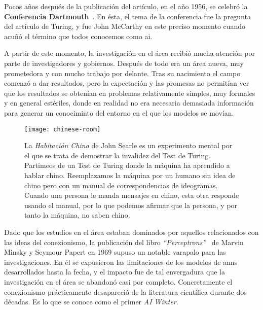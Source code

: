 Pocos años después de la publicación del artículo, en el año 1956, se celebró la \textbf{Conferencia Dartmouth}~\cite{mccarthy1956dartmouth}. En ésta, el tema de la conferencia fue la pregunta del artículo de Turing, y fue John McCarthy en este preciso momento cuando acuñó el término que todos conocemos como \ac{ai}.

A partir de este momento, la investigación en el área recibió mucha atención por parte de investigadores y gobiernos. Después de todo era un área nueva, muy prometedora y con mucho trabajo por delante. Tras su nacimiento el campo comenzó a dar resultados, pero la expectación y las promesas no permitían ver que los resultados se obtenían en problemas relativamente simples, muy formales y en general estériles, donde en realidad no era necesaria demasiada información para generar un conociminto del entorno en el que los modelos se movían.

\begin{figure}[t]
	\centering
	\texttt{[image: chinese-room]}
	\label{fig:chinese-room}
	\caption[Experimento mental de la \textit{Habitación China}, por John Searle]{La \textit{Habitación China} de John Searle es un experimento mental por el que se trata de demostrar la invalidez del Test de Turing. Partimeos de un Test de Turing donde la máquina ha aprendido a hablar chino. Reemplazamos la máquina por un humano sin idea de chino pero con un manual de correspondencias de ideogramas. Cuando una persona le manda mensajes en chino, esta otra responde usando el manual, por lo que podemos afirmar que la persona, y por tanto la máquina, no saben chino.}
\end{figure}

Dado que los estudios en el área estaban dominados por aquellos relacionados con las ideas del conexionismo, la publicación del libro \textit{\enquote{Perceptrons}}~\cite{minsky1969perceptrons} de Marvin Minsky y Seymour Papert en 1969 supuso un notable varapalo para las investigaciones. En él se expusieron las limitaciones de los modelos de \acp{ann} desarrollados hasta la fecha, y el impacto fue de tal envergadura que la investigación en el área se abandonó casi por completo. Concretamente el conexionismo prácticamente desapareció de la literatura científica durante dos décadas. Es lo que se conoce como el primer \textit{AI Winter}.

